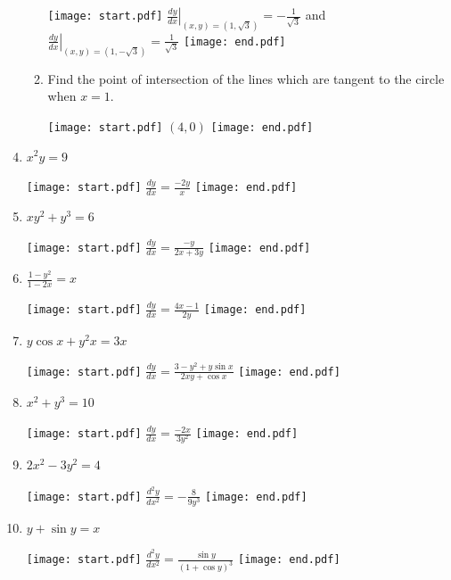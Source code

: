 \documentclass[12pt]{article}
\begin{document}
\begin{enumerate}
\begin{enumerate}
\texttt{[image: start.pdf]}
{{$\left.\frac{dy}{dx}\right|_{(x,y)=\left(1,\sqrt{3}\right)}=-\frac{1}{\sqrt{3}}$ and $\left.\frac{dy}{dx}\right|_{(x,y)=\left(1,-\sqrt{3}\right)}=\frac{1}{\sqrt{3}}$}}
\texttt{[image: end.pdf]}


\item Find the point of intersection of the lines which are tangent to the circle when $x=1$.

\texttt{[image: start.pdf]}
{{$(4,0)$}}
\texttt{[image: end.pdf]}


\end{enumerate}

\end{enumerate}


\begin{enumerate}
\setcounter{enumi}{3}

\item $x^2y=9$ 

\texttt{[image: start.pdf]}
{{$\frac{dy}{dx}=\frac{-2y}{x}$}}
\texttt{[image: end.pdf]}


\item $xy^2+y^3 = 6$ 

\texttt{[image: start.pdf]}
{{$\frac{dy}{dx}=\frac{-y}{2x+3y}$}}
\texttt{[image: end.pdf]}


\item $\frac{1-y^2}{1-2x}=x$ 

\texttt{[image: start.pdf]}
{{$\frac{dy}{dx}=\frac{4x-1}{2y}$}}
\texttt{[image: end.pdf]}


\item $y\cos{x} + y^2x = 3x$ 

\texttt{[image: start.pdf]}
{{$\frac{dy}{dx}=\frac{3-y^2+y\sin{x}}{2xy+\cos{x}}$}}
\texttt{[image: end.pdf]}


\item $x^2+y^3=10$ 

\texttt{[image: start.pdf]}
{{$\frac{dy}{dx}=\frac{-2x}{3y^2}$}}
\texttt{[image: end.pdf]}


\end{enumerate}


\begin{enumerate}
\setcounter{enumi}{8}

\item $2x^2-3y^2=4$

\texttt{[image: start.pdf]}
{{$\frac{d^2y}{dx^2}=-\frac{8}{9y^3}$}}
\texttt{[image: end.pdf]}


\item $y+\sin{y}=x$

\texttt{[image: start.pdf]}
{{$\frac{d^2y}{dx^2}=\frac{\sin{y}}{(1+\cos{y})^3}$}}
\texttt{[image: end.pdf]}


\end{enumerate}
\end{document}

